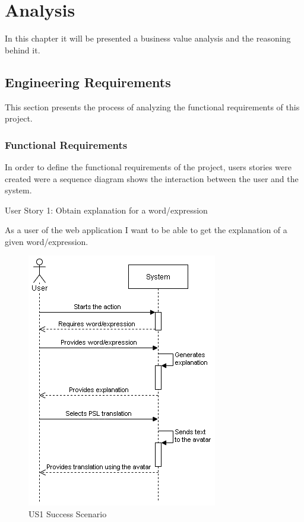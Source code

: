 
\chapter{Analysis} %
\label{chap:Chapter3} %

In this chapter it will be presented a business value analysis and the reasoning behind it.

\section{Engineering Requirements}

This section presents the process of analyzing the functional requirements of this project.

\subsection{Functional Requirements}

In order to define the functional requirements of the project, users stories were created were a sequence diagram shows the interaction between the user and the system.

User Story 1: Obtain explanation for a word/expression

As a user of the web application I want to be able to get the explanation of a given word/expression.

\begin{figure}[H]
\centering
\includegraphics[scale=0.65]{ch3/assets/ssd.png}
\caption[US1 Success Scenario]{US1 Success Scenario}
\label{fig:ssd1}
\end{figure}


